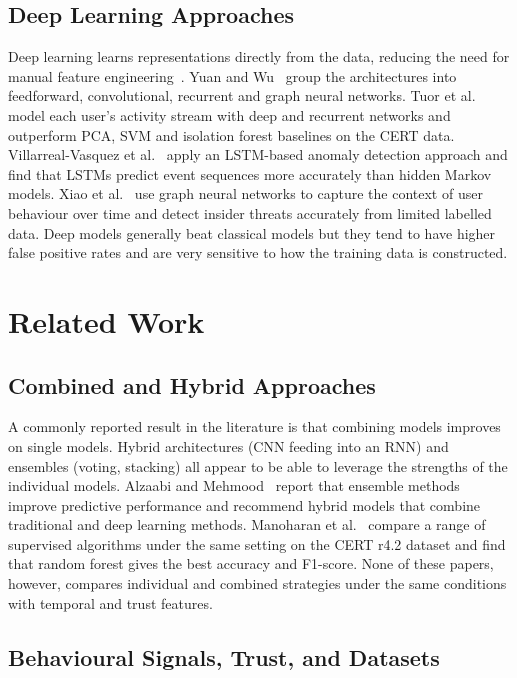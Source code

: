 \documentclass[a4paper,12pt]{article}
\begin{document}
\subsection{Deep Learning Approaches}
\label{sec:4.3}

Deep learning learns representations directly from the data, reducing the need for manual feature engineering~\cite{lecun2015}. Yuan and Wu~\cite{yuan2021} group the architectures into feedforward, convolutional, recurrent and graph neural networks. Tuor et al.~\cite{tuor2017} model each user's activity stream with deep and recurrent networks and outperform PCA, SVM and isolation forest baselines on the CERT data. Villarreal-Vasquez et al.~\cite{villarreal2023} apply an LSTM-based anomaly detection approach and find that LSTMs predict event sequences more accurately than hidden Markov models. Xiao et al.~\cite{xiao2023} use graph neural networks to capture the context of user behaviour over time and detect insider threats accurately from limited labelled data. Deep models generally beat classical models but they tend to have higher false positive rates and are very sensitive to how the training data is constructed.

\section{Related Work}
\label{sec:5}

\subsection{Combined and Hybrid Approaches}
\label{sec:5.1}

A commonly reported result in the literature is that combining models improves on single models. Hybrid architectures (CNN feeding into an RNN) and ensembles (voting, stacking) all appear to be able to leverage the strengths of the individual models. Alzaabi and Mehmood~\cite{alzaabi2024} report that ensemble methods improve predictive performance and recommend hybrid models that combine traditional and deep learning methods. Manoharan et al.~\cite{manoharan2024} compare a range of supervised algorithms under the same setting on the CERT r4.2 dataset and find that random forest gives the best accuracy and F1-score. None of these papers, however, compares individual and combined strategies under the same conditions with temporal and trust features.

\subsection{Behavioural Signals, Trust, and Datasets}
\label{sec:5.2}
\end{document}
